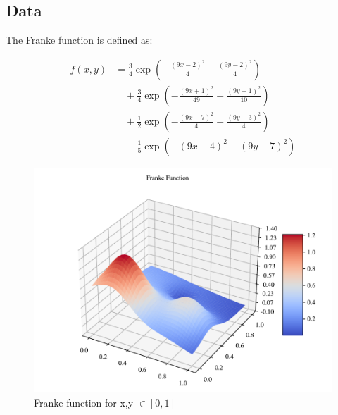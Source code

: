 \subsection{Data}


The Franke function is defined as:

\begin{align}
    f(x, y) &= \frac{3}{4} \exp\left( -\frac{(9x - 2)^2}{4} - \frac{(9y - 2)^2}{4} \right) \nonumber \\
    &\quad + \frac{3}{4} \exp\left( -\frac{(9x + 1)^2}{49} - \frac{(9y + 1)^2}{10} \right) \nonumber \\
    &\quad + \frac{1}{2} \exp\left( -\frac{(9x - 7)^2}{4} - \frac{(9y - 3)^2}{4} \right) \nonumber \\
    &\quad - \frac{1}{5} \exp\left( -(9x - 4)^2 - (9y - 7)^2 \right)
\end{align}


\begin{figure}[h!]
\centering
\includegraphics[width=1\linewidth]{project_1_alt/figures/data/franke_func.pdf}
\caption{Franke function for x,y $\in [0,1]$}
\label{franke}
\end{figure}

